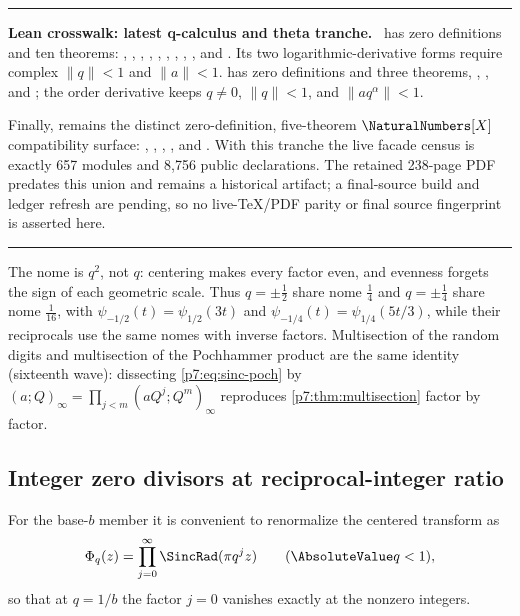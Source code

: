 \documentclass[11pt,oneside]{article}
\numberwithin{equation}{section}
\theoremstyle{definition}
\theoremstyle{remark}
\newenvironment{statusbox}[1]{%
  \par\medskip\noindent\begin{center}\begin{minipage}{0.94\textwidth}%
  \color{linkblue}\hrule\vspace{0.65em}%
  \color{black}\textbf{\color{linkblue}#1.}\ }{%
  \par\vspace{0.65em}\color{linkblue}\hrule
  \end{minipage}\end{center}\medskip}
\begin{document}
\begin{statusbox}{Lean crosswalk: latest q-calculus and theta tranche}
 has zero definitions and ten theorems:
,
,
, ,
,
,
, ,
, and
.  Its two logarithmic-derivative
forms require complex \(\lVert q\rVert<1\) and \(\lVert a\rVert<1\).
 has zero definitions and three
theorems, ,
, and
; the order derivative keeps
\(q\ne0\), \(\lVert q\rVert<1\), and \(\lVert aq^\alpha\rVert<1\).

Finally,  remains the distinct
zero-definition, five-theorem \(\NaturalNumbers[X]\) compatibility surface:
,
,
,
, and
.  With this tranche the live
facade census is exactly 657 modules and 8,756 public declarations.  The
retained 238-page PDF predates this union and remains a historical artifact;
a final-source build and ledger refresh are pending, so no live-TeX/PDF parity
or final source fingerprint is asserted here.
\end{statusbox}

The nome is $q^2$, not $q$: centering makes every factor even, and evenness
forgets the sign of each geometric scale.  Thus $q=\pm\tfrac12$ share nome
$\tfrac14$ and $q=\pm\tfrac14$ share nome $\tfrac1{16}$, with
$\psi_{-1/2}(t)=\psi_{1/2}(3t)$ and $\psi_{-1/4}(t)=\psi_{1/4}(5t/3)$, while
their reciprocals use the same nomes with inverse factors.  Multisection of
the random digits and multisection of the Pochhammer product are the same
identity (sixteenth wave): dissecting \eqref{p7:eq:sinc-poch} by
$(a;Q)_\infty=\prod_{j<m}(aQ^j;Q^m)_\infty$ reproduces
\cref{p7:thm:multisection} factor by factor.

\subsection{Integer zero divisors at reciprocal-integer ratio}

For the base-$b$ member it is convenient to renormalize the centered
transform as
\begin{equation}\label{p7:eq:Phi-q}
 \Phi_q(z)=\prod_{j=0}^{\infty}\SincRad(\pi q^jz)
 \qquad(\AbsoluteValue q<1),
\end{equation}
so that at $q=1/b$ the factor $j=0$ vanishes exactly at the nonzero integers.
\end{document}
